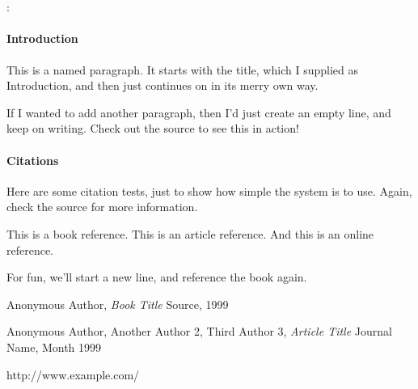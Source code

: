 \documentclass[12pt,oneside]{article}
\begin{document}


\begin{center}
{\large\bf \projectTitle \\ ~\\}
{\teamName: \\\teamMembers}
\end{center}

\doublespace

\paragraph{Introduction}
This is a named paragraph. It starts with the title, which I supplied as
Introduction, and then just continues on in its merry own way.

If I wanted to add another paragraph, then I'd just create an empty line,
and keep on writing. Check out the source to see this in action!

\paragraph{Citations}
Here are some citation tests, just to show how simple the system is to use. 
Again, check the source for more information.

This is a book\cite{book99} reference. This is an article\cite{journal99}
reference. And this is an online\cite{url99} reference.

For fun, we'll start a new line, and reference the book\cite{book99} again.

\singlespace

\begin{thebibliography}{99}

    Anonymous Author,
    \emph{Book Title}
    Source,
    1999

    Anonymous Author,
        Another Author 2,
        Third Author 3,
    \emph{Article Title}
    Journal Name,
    Month 1999

    http://www.example.com/

\end{thebibliography}
\end{document}
